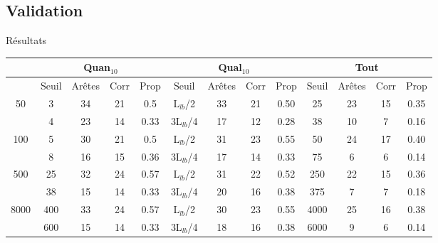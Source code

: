 \documentclass{beamer}
\begin{document}
\subsection{Validation}
\begin{frame}{Résultats}

\begin{table}[H]

\begin{tabular}{|@{}c@{}|@{}c@{}|@{}c@{}|@{}c@{}|@{}c@{}||@{}c@{}|@{}c@{}|@{}c@{}|@{}c@{}||@{}c@{}|@{}c@{}|@{}c@{}|@{}c@{}|}

\hline
 & \multicolumn{4}{c|}{Quan$_{10}$} & \multicolumn{4}{c|}{Qual$_{10}$} & \multicolumn{4}{c|}{Tout} \\
 \hline
 & Seuil & Arêtes & Corr & Prop & Seuil & Arêtes & Corr & Prop & Seuil & Arêtes & Corr & Prop \\
 \hline
 50 & 3 & 34 & 21 & 0.5 & L$_{lb}$/2 & 33 & 21 & 0.50 & 25 & 23 & 15 & 0.35 \\
 \cline{2-13} 
    & 4 & 23 & 14 & 0.33 & 3L$_{lb}$/4 & 17 & 12 & 0.28 & 38 & 10 & 7 & 0.16 \\
  \hline
   100 & 5 & 30 & 21 & 0.5 & L$_{lb}$/2 & 31 & 23 & 0.55 & 50 & 24 & 17 & 0.40 \\
 \cline{2-13} 
    & 8 & 16 & 15 & 0.36 & 3L$_{lb}$/4 & 17 & 14 & 0.33 & 75 & 6 & 6 & 0.14 \\
  \hline
   500 & 25 & 32 & 24 & 0.57 & L$_{lb}$/2 & 31 & 22 & 0.52 & 250 & 22 & 15 & 0.36 \\
 \cline{2-13} 
    & 38 & 15 & 14 & 0.33 & 3L$_{lb}$/4 & 20 & 16 & 0.38 & 375 & 7 & 7 & 0.18 \\
  \hline
   8000 & 400 & 33 & 24 & 0.57 & L$_{lb}$/2 & 30 & 23 & 0.55 & 4000 & 25 & 16 & 0.38 \\
 \cline{2-13} 
    & 600 & 15 & 14 & 0.33 & 3L$_{lb}$/4 & 18 & 16 & 0.38 & 6000 & 9 & 6 & 0.14 \\
  \hline

\end{tabular}


\end{table}
\end{frame}
\end{document}
